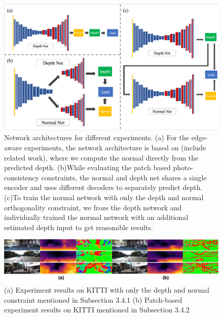 \documentclass[10pt,twocolumn,letterpaper]{article}
\begin{document}
\begin{figure}
  \includegraphics[width=\columnwidth ]{network.png}
  \caption{Network architectures for different experiments. (a) For the edge-aware experiments, the network architecture is based on (include related work), where we compute the normal directly from the predicted depth. (b)While evaluating the patch based photo-consistency constraints, the normal and depth net shares a single encoder and uses different decoders to separately predict depth. (c)To train the normal network with only the depth and normal orthogonality constraint, we froze the depth network and individually trained the normal network with an additional estimated depth input to get reasonable results.}
  \label{fig:network}
\end{figure}

\begin{figure}[ht]
  \includegraphics[width=\linewidth]{depth_KITTI.png}
  \caption{(a) Experiment results on KITTI with only the depth and normal constraint mentioned in Subsection 3.4.1 (b) Patch-based experiment results on KITTI mentioned in Subsection 3.4.2}
\label{normal:depth}
\end{figure}
\end{document}
